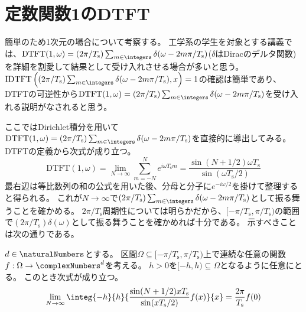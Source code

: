 			\section{定数関数1のDTFT}
				\label{定数関数1のDTFT}
				簡単のため1次元の場合について考察する。
				工学系の学生を対象とする講義では、$\text{DTFT}(1,\omega) = (2\pi/T_\text{s})\sum_{m\in\integers}\delta(\omega-2m\pi/T_\text{s})$($\delta$はDiracのデルタ関数)を詳細を割愛して結果として受け入れさせる場合が多いと思う。
				$\text{IDTFT}\left((2\pi/T_\text{s})\sum_{m\in\integers}\delta(\omega-2m\pi/T_\text{s}),x\right)=1$の確認は簡単であり、DTFTの可逆性から$\text{DTFT}(1,\omega) = (2\pi/T_\text{s})\sum_{m\in\integers}\delta(\omega-2m\pi/T_\text{s})$を受け入れる説明がなされると思う。
				\par
				ここではDirichlet積分を用いて$\text{DTFT}(1,\omega) = (2\pi/T_\text{s})\sum_{m\in\integers}\delta(\omega-2m\pi/T_\text{s})$を直接的に導出してみる。
				DTFTの定義から次式が成り立つ。
				\[
					\text{DTFT}(1,\omega) = \lim_{N\to\infty} \sum_{m=-N}^N e^{i\omega T_\text{s} m} = \frac{\sin(N+1/2)\omega T_\text{s}}{\sin(\omega T_\text{s}/2)}
				\]
				最右辺は等比数列の和の公式を用いた後、分母と分子に$e^{-i\omega/2}$を掛けて整理すると得られる。
				これが$N\to\infty$で$(2\pi/T_\text{s})\sum_{m\in\integers}\delta(\omega-2m\pi/T_\text{s})$として振る舞うことを確かめる。
				$2\pi/T_\text{s}$周期性については明らかだから、$[-\pi/T_\text{s},\pi/T_\text{s})$の範囲で$(2\pi/T_\text{s})\delta(\omega)$として振る舞うことを確かめれば十分である。
				示すべきことは次の通りである。
				\begin{shadebox}
					$d\in\naturalNumbers$とする。
					区間$\Omega \subseteq [-\pi/T_\text{s},\pi/T_\text{s})$上で連続な任意の関数$f:\Omega\to\complexNumbers^d$を考える。
					$h>0$を$[-h,h) \subseteq \Omega$となるように任意にとる。
					このとき次式が成り立つ。
					\[
						\lim_{N\to\infty} \integ{-h}{h}{\frac{\sin(N+1/2)x T_\text{s}}{\sin(x T_\text{s}/2)} f(x)}{x} = \frac{2\pi}{T_\text{s}} f(0)
					\]
				\end{shadebox}
